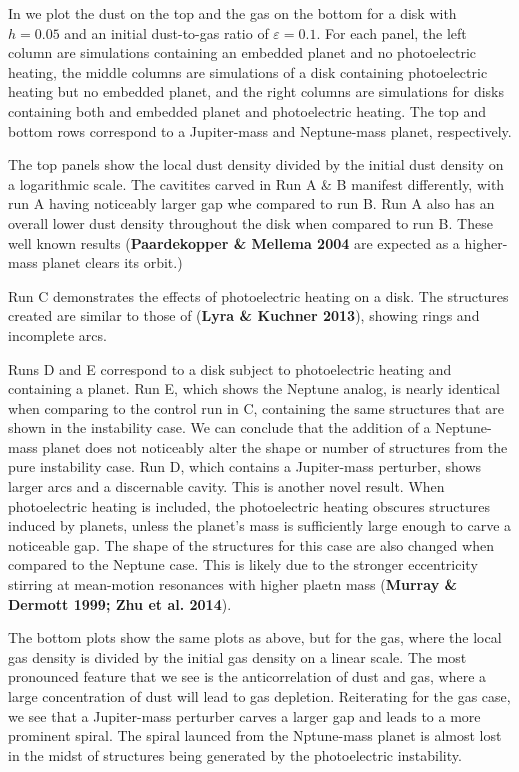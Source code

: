 \documentclass[onecolumn]{report}
\newcommand{\epsi}{\varepsilon}
\begin{document}
In  we plot the dust on the top and the gas on the bottom for a disk with $h=0.05$ and an initial dust-to-gas ratio of $\epsi=0.1$. For each panel, the left column are simulations containing an embedded planet and no photoelectric heating, the middle columns are simulations of a disk containing photoelectric heating but no embedded planet, and the right columns are simulations for disks containing both and embedded planet and photoelectric heating. The top and bottom rows correspond to a Jupiter-mass and Neptune-mass planet, respectively.

The top panels show the local dust density divided by the initial dust density on a logarithmic scale. The cavitites carved in Run A \& B manifest differently, with run A having noticeably larger gap whe compared to run B. Run A also has an overall lower dust density throughout the disk when compared to run B. These well known results (\textbf{Paardekopper \& Mellema 2004} are expected as a higher-mass planet clears its orbit.)

Run C demonstrates the effects of photoelectric heating on a disk. The structures created are similar to those of (\textbf{Lyra \& Kuchner 2013}), showing rings and incomplete arcs.

Runs D and E correspond to a disk subject to photoelectric heating and containing a planet. Run E, which shows the Neptune analog, is nearly identical when comparing to the control run in C, containing the same structures that are shown in the instability case. We can conclude that the addition of a Neptune-mass planet does not noticeably alter the shape or number of structures from the pure instability case. Run D, which contains a Jupiter-mass perturber, shows larger arcs and a discernable cavity. This is another novel result. When photoelectric heating is included, the photoelectric heating obscures structures induced by planets, unless the planet's mass is sufficiently large enough to carve a noticeable gap. The shape of the structures for this case are also changed when compared to the Neptune case. This is likely due to the stronger eccentricity stirring at mean-motion resonances with higher plaetn mass (\textbf{Murray \& Dermott 1999; Zhu et al. 2014}).

The bottom plots show the same plots as above, but for the gas, where the local gas density is divided by the initial gas density on a linear scale. The most pronounced feature that we see is the anticorrelation of dust and gas, where a large concentration of dust will lead to gas depletion. Reiterating for the gas case, we see that a Jupiter-mass perturber carves a larger gap and leads to a more prominent spiral. The spiral launced from the Nptune-mass planet is almost lost in the midst of structures being generated by the photoelectric instability.
\end{document}
